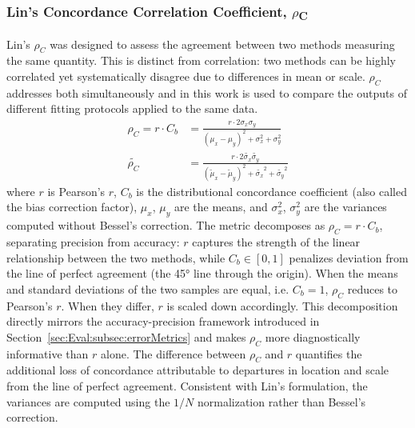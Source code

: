 \subsubsection{Lin’s Concordance Correlation Coefficient, \textnormal{$\rho$\textsubscript{C}}} \label{sec:Eval:subsec:RegMetrics:subsubsec:Lin's rho}
Lin's $\rho_C$ \cite{Lin1989} was designed to assess the agreement between two methods measuring the same quantity. This is distinct from correlation: two methods can be highly correlated yet systematically disagree due to differences in mean or scale. $\rho_C$ addresses both simultaneously and in this work is used to compare the outputs of different fitting protocols applied to the same data.
\begin{subequations}
    \begin{align}
        \rho_C = r \cdot C_b &= \frac{r \cdot 2\sigma_x\sigma_y}{\left(\mu_x-\mu_y\right)^2 + \sigma_x^2 + \sigma_y^2} \label{eqn:lin's rho}\\ 
        \widetilde{\rho_C} &= \frac{r \cdot 2\widetilde{\sigma_x}\widetilde{\sigma_y}}{\left(\widetilde{\mu}_x-\widetilde{\mu}_y\right)^2 + \widetilde{\sigma_x}^2 + \widetilde{\sigma_y}^2}\label{eqn:lin's rho np}
    \end{align}
\end{subequations}
\noindent where $r$ is Pearson's $r$, $C_b$ is the distributional concordance coefficient (also called the bias correction factor), $\mu_x$, $\mu_y$ are the means, and $\sigma^2_x$, $\sigma^2_y$ are the variances computed without Bessel's correction. The metric decomposes as $\rho_C = r \cdot C_b$, separating precision from accuracy: $r$ captures the strength of the linear relationship between the two methods, while $C_b \in [0,1]$ penalizes deviation from the line of perfect agreement (the 45° line through the origin). When the means and standard deviations of the two samples are equal, i.e. $C_b = 1$, $\rho_C$ reduces to Pearson's $r$. When they differ, $r$ is scaled down accordingly. This decomposition directly mirrors the accuracy-precision framework introduced in Section~\ref{sec:Eval:subsec:errorMetrics} and makes $\rho_C$ more diagnostically informative than $r$ alone. The difference between $\rho_C$ and $r$ quantifies the additional loss of concordance attributable to departures in location and scale from the line of perfect agreement. Consistent with Lin's formulation, the variances are computed using the $1/N$ normalization rather than Bessel's correction.

